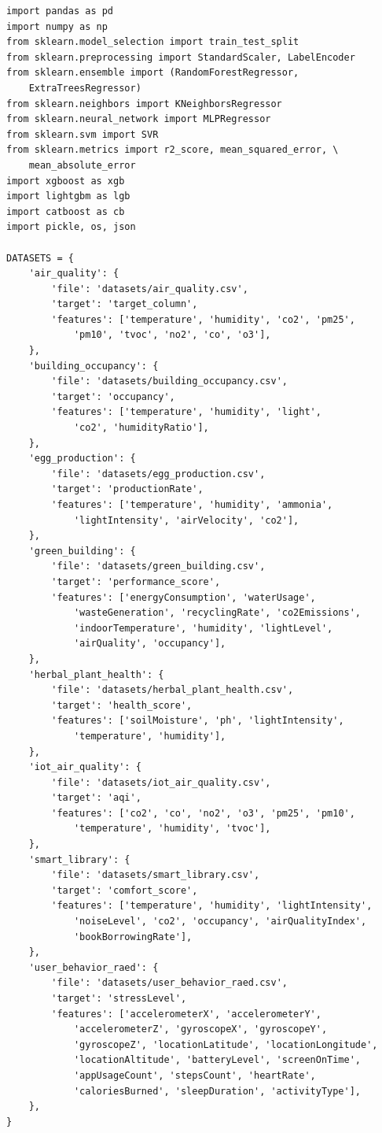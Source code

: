 \documentclass[12pt,a4paper,oneside]{report}
\begin{document}
\begin{lstlisting}[style=pythonstyle]
import pandas as pd
import numpy as np
from sklearn.model_selection import train_test_split
from sklearn.preprocessing import StandardScaler, LabelEncoder
from sklearn.ensemble import (RandomForestRegressor,
    ExtraTreesRegressor)
from sklearn.neighbors import KNeighborsRegressor
from sklearn.neural_network import MLPRegressor
from sklearn.svm import SVR
from sklearn.metrics import r2_score, mean_squared_error, \
    mean_absolute_error
import xgboost as xgb
import lightgbm as lgb
import catboost as cb
import pickle, os, json

DATASETS = {
    'air_quality': {
        'file': 'datasets/air_quality.csv',
        'target': 'target_column',
        'features': ['temperature', 'humidity', 'co2', 'pm25',
            'pm10', 'tvoc', 'no2', 'co', 'o3'],
    },
    'building_occupancy': {
        'file': 'datasets/building_occupancy.csv',
        'target': 'occupancy',
        'features': ['temperature', 'humidity', 'light',
            'co2', 'humidityRatio'],
    },
    'egg_production': {
        'file': 'datasets/egg_production.csv',
        'target': 'productionRate',
        'features': ['temperature', 'humidity', 'ammonia',
            'lightIntensity', 'airVelocity', 'co2'],
    },
    'green_building': {
        'file': 'datasets/green_building.csv',
        'target': 'performance_score',
        'features': ['energyConsumption', 'waterUsage',
            'wasteGeneration', 'recyclingRate', 'co2Emissions',
            'indoorTemperature', 'humidity', 'lightLevel',
            'airQuality', 'occupancy'],
    },
    'herbal_plant_health': {
        'file': 'datasets/herbal_plant_health.csv',
        'target': 'health_score',
        'features': ['soilMoisture', 'ph', 'lightIntensity',
            'temperature', 'humidity'],
    },
    'iot_air_quality': {
        'file': 'datasets/iot_air_quality.csv',
        'target': 'aqi',
        'features': ['co2', 'co', 'no2', 'o3', 'pm25', 'pm10',
            'temperature', 'humidity', 'tvoc'],
    },
    'smart_library': {
        'file': 'datasets/smart_library.csv',
        'target': 'comfort_score',
        'features': ['temperature', 'humidity', 'lightIntensity',
            'noiseLevel', 'co2', 'occupancy', 'airQualityIndex',
            'bookBorrowingRate'],
    },
    'user_behavior_raed': {
        'file': 'datasets/user_behavior_raed.csv',
        'target': 'stressLevel',
        'features': ['accelerometerX', 'accelerometerY',
            'accelerometerZ', 'gyroscopeX', 'gyroscopeY',
            'gyroscopeZ', 'locationLatitude', 'locationLongitude',
            'locationAltitude', 'batteryLevel', 'screenOnTime',
            'appUsageCount', 'stepsCount', 'heartRate',
            'caloriesBurned', 'sleepDuration', 'activityType'],
    },
}


\end{lstlisting}
\end{document}
